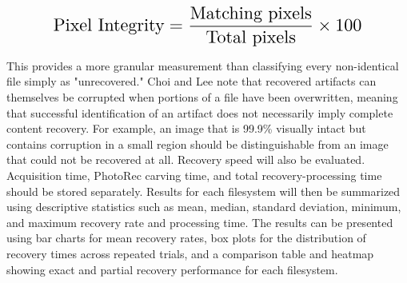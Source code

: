 \documentclass[conference]{IEEEtran}
\begin{document}
\begin{equation}
\resizebox{0.80\columnwidth}{!}{$\displaystyle
\text{Pixel Integrity} = \frac{\text{Matching pixels}}{\text{Total pixels}} \times 100
$}
\end{equation}

This provides a more granular measurement than classifying every non-identical file simply as "unrecovered." Choi and Lee \cite{choi2022raid} note that recovered artifacts can themselves be corrupted when portions of a file have been overwritten, meaning that successful identification of an artifact does not necessarily imply complete content recovery. For example, an image that is 99.9\% visually intact but contains corruption in a small region should be distinguishable from an image that could not be recovered at all.
Recovery speed will also be evaluated. Acquisition time, PhotoRec carving time, and total recovery-processing time should be stored separately. Results for each filesystem will then be summarized using descriptive statistics such as mean, median, standard deviation, minimum, and maximum recovery rate and processing time.
The results can be presented using bar charts for mean recovery rates, box plots for the distribution of recovery times across repeated trials, and a comparison table and heatmap showing exact and partial recovery performance for each filesystem.
\end{document}
